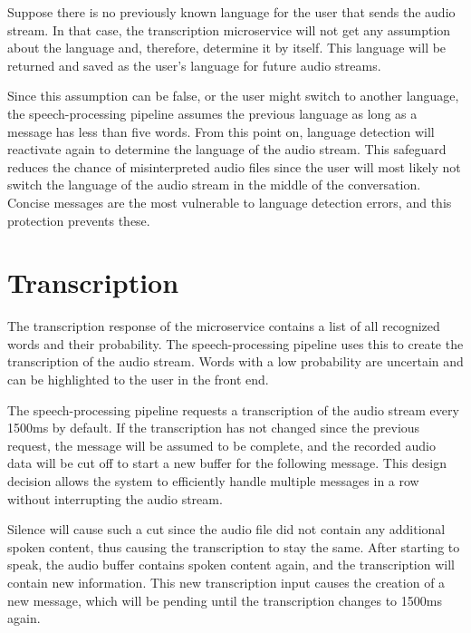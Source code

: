 Suppose there is no previously known language for the user that sends the audio stream. In that case, the transcription 
microservice will not get any assumption about the language and, therefore, determine it by itself. This language will 
be returned and saved as the user's language for future audio streams.

Since this assumption can be false, or the user might switch to another language, the speech-processing pipeline 
assumes the previous language as long as a message has less than five words. From this point on, language detection 
will reactivate again to determine the language of the audio stream. This safeguard reduces the chance of 
misinterpreted audio files since the user will most likely not switch the language of the audio stream in the middle 
of the conversation. Concise messages are the most vulnerable to language detection errors, and this protection 
prevents these.


\section{Transcription}

The transcription response of the microservice contains a list of all recognized words and their probability. The 
speech-processing pipeline uses this to create the transcription of the audio stream. Words with a low probability are 
uncertain and can be highlighted to the user in the front end.

The speech-processing pipeline requests a transcription of the audio stream every 1500ms by default. If the 
transcription has not changed since the previous request, the message will be assumed to be complete, and the recorded 
audio data will be cut off to start a new buffer for the following message. This design decision allows the system to 
efficiently handle multiple messages in a row without interrupting the audio stream.

Silence will cause such a cut since the audio file did not contain any additional spoken content, thus causing the 
transcription to stay the same. After starting to speak, the audio buffer contains spoken content again, and the 
transcription will contain new information. This new transcription input causes the creation of a new message, which 
will be pending until the transcription changes to 1500ms again.
